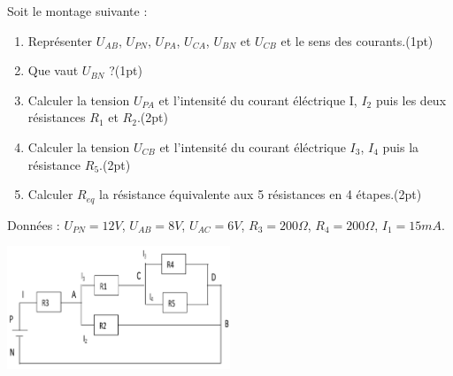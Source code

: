 \documentclass[12pt]{article}
\begin{document}
Soit le montage suivante :
\begin{enumerate}
    \item Représenter $U_{AB}$, $U_{PN}$, $U_{PA}$, $U_{CA}$,  $U_{BN}$ et $U_{CB}$ et le sens des courants.\dotfill(1pt)
    \item Que vaut $U_{BN}$ ?\dotfill(1pt)
    \item Calculer la tension $U_{PA}$ et l’intensité du courant éléctrique I, $I_2$ puis les deux résistances $R_1$ et $R_2$.\dotfill(2pt)
    \item Calculer la tension $U_{CB}$ et l’intensité du courant éléctrique $I_3$, $I_4$ puis la résistance $R_5$.\dotfill(2pt)
    \item Calculer $R_{eq}$ la résistance équivalente aux 5 résistances en 4 étapes.\dotfill(2pt)
\end{enumerate}
Données : $U_{PN} = 12V$, $U_{AB} = 8V$, $U_{AC} = 6V$, $R_3 = 200\Omega$, $R_4 = 200\Omega$, $I_1 =15 mA.$
\begin{center}
    \includegraphics[width=0.5\textwidth]{./img/resistance.png}
\end{center}
\end{document}
